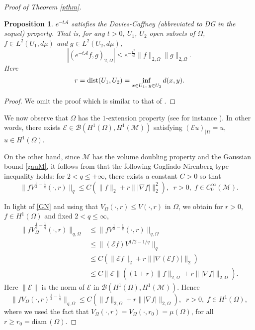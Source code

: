 \documentclass[10pt]{amsart}
\newtheorem{proposition}{Proposition}
\theoremstyle{definition}
\begin{document}
\begin{proof}[Proof of Theorem \ref{pthm}]
\begin{proposition}\label{proposition2}
$e^{-t\mathcal{A}}$ satisfies the Davies-Caffney (abbreviated to DG in the sequel) property. That is, for any $t>0$, $U_1$, $U_2$ open subsets of $\Omega$, $f\in L^2(U_1,d\mu )$ and $g\in L^2(U_2,d\mu )$,
\[
\left| (e^{-t\mathcal{A}}f,g)_{2,\Omega}\right|\leq e^{-\frac{r^2}{4t}}\|f\|_{2,\Omega }\|g\|_{2,\Omega}.
\]
Here
\[
r={\rm dist}(U_1,U_2)=\inf_{x\in U_1,\; y\in U_2}d(x,y).
\]
\end{proposition}

\begin{proof}
We omit  the proof which is similar to that of \cite[Theorem 3.3, page 515]{CS}.
\end{proof} 

We now observe that $\Omega$ has the $1$-extension property (see for instance \cite[Theorem C]{MMS}). In other words, there exists $\mathcal{E}\in \mathscr{B}(H^1(\Omega ),H^1(\mathcal{M}))$ satisfying $(\mathcal{E}u)_{|\Omega}=u$, $u\in H^1(\Omega )$.

\smallskip
On the other hand, since $\mathcal{M}$ has the volume doubling property and the Gaussian bound \eqref{gauM}, it follows from 
\cite[Theorem 1.2.1]{BCS}  that the following Gagliado-Nirenberg type inequality holds: for $2<q\leq +\infty$, there exists a constant $C>0$ so that
\begin{equation}\label{GN}
\|fV^{\frac{1}{2}-\frac{1}{q}}(\cdot ,r)\|_q\leq C\left (\|f\|_2+r\||\nabla f|\|_2^2\right),\;\; r>0,\; f\in C_0^\infty (\mathcal{M}).
\end{equation}

In light of \eqref{GN} and using that $V_\Omega (\cdot ,r)\leq V(\cdot ,r)$ in $\Omega$, we obtain for
 $r>0$, $f\in H^1(\Omega )$ and fixed $2<q\leq \infty$, 
\begin{align*}
\|fV_\Omega ^{\frac{1}{2}-\frac{1}{q}}(\cdot ,r)\|_{q,\Omega } &\leq \|fV^{\frac{1}{2}-\frac{1}{q}}(\cdot ,r)\|_{q,\Omega }
\\
&\leq \|(\mathcal{E}f)V^{1/2-1/q}\|_q
\\
&\leq C\left( \|\mathcal{E}f\|_2+r\| |\nabla (\mathcal{E}f)|\|_2\right)
\\
& \leq C\|\mathcal{E}\|  \left( (1+r)\|f\|_{2,\Omega }+r\| |\nabla f|\|_{2,\Omega }\right) .
\end{align*}
Here $\|\mathcal{E}\|$ is the norm of $\mathcal{E}$ in $\mathscr{B}(H^1(\Omega ),H^1(\mathcal{M}))$. Hence
\begin{equation}\label{gn}
\|fV_\Omega (\cdot ,r)^{\frac{1}{2}-\frac{1}{q}}\|_{q,\Omega }\leq C \left( \|f\|_{2,\Omega }+r\| |\nabla f|\|_{2,\Omega }\right),\;\; r>0,\; f\in H^1(\Omega ),
\end{equation}
where we used the fact that $V_\Omega (\cdot ,r)=V_\Omega (\cdot ,r_0)=\mu (\Omega )$, for all $r\geq r_0=\textrm{diam}\, (\Omega )$.


\end{proof}
\end{document}
